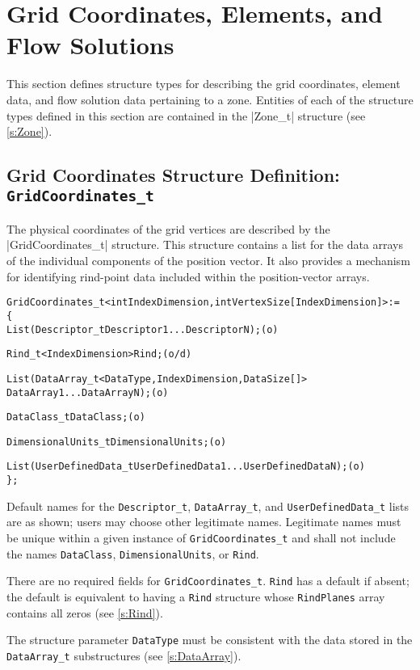 \section{Grid Coordinates, Elements, and Flow Solutions}
\label{s:gridflow}
\thispagestyle{plain}

This section defines structure types for describing the grid
coordinates, element data, and flow solution data pertaining to a zone.
Entities of each of the structure types defined in this section are
contained in the |Zone_t| structure (see \autoref{s:Zone}).

\subsection{Grid Coordinates Structure Definition: \texttt{GridCoordinates\_t}}
\label{s:Grid}

The physical coordinates of the grid vertices are described by the 
|GridCoordinates_t| structure.  This structure contains a list for the 
data arrays of the individual components of the position vector.  It also
provides a mechanism for identifying rind-point data included within the
position-vector arrays.

\begin{alltt}
  GridCoordinates\_t< int IndexDimension, int VertexSize[IndexDimension] > :=
    \{
    List( Descriptor\_t Descriptor1 ... DescriptorN ) ;                      (o)
 
    Rind\_t<IndexDimension> Rind ;                                           (o/d)

    List( DataArray\_t<DataType, IndexDimension, DataSize[]> 
          DataArray1 ... DataArrayN ) ;                                     (o)

    DataClass\_t DataClass ;                                                 (o)
    
    DimensionalUnits\_t DimensionalUnits ;                                   (o)

    List( UserDefinedData\_t UserDefinedData1 ... UserDefinedDataN ) ;       (o)
    \} ;
\end{alltt}

\begin{notes}
\item Default names for the \texttt{Descriptor\_t},
      \texttt{DataArray\_t}, and \texttt{UserDefinedData\_t} lists are
      as shown; users may choose other legitimate names.
      Legitimate names must be unique within a given instance of
      \texttt{GridCoordinates\_t} and shall not include the names
      \texttt{DataClass}, \texttt{DimensionalUnits}, or \texttt{Rind}.
\item There are no required fields for \texttt{GridCoordinates\_t}.
      \texttt{Rind} has a default if absent; the default is equivalent
      to having a \texttt{Rind} structure whose \texttt{RindPlanes}
      array contains all zeros (see \autoref{s:Rind}).
\item The structure parameter \texttt{DataType} must be consistent with
      the data stored in the \texttt{DataArray\_t} substructures (see
      \autoref{s:DataArray}).
\end{notes}

